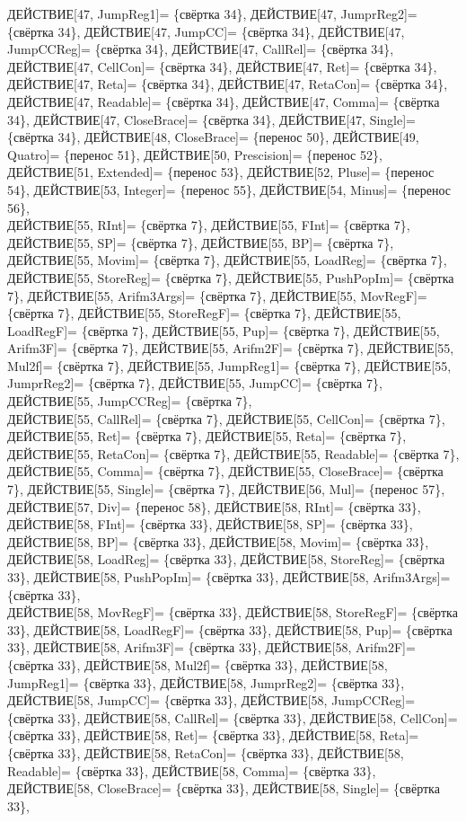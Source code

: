 \documentclass[a0]{a0poster}
\begin{document}
ДЕЙСТВИЕ[47, JumpReg1]= \{свёртка 34\}, ДЕЙСТВИЕ[47, JumprReg2]= \{свёртка 34\}, ДЕЙСТВИЕ[47, JumpCC]= \{свёртка 34\}, ДЕЙСТВИЕ[47, JumpCCReg]= \{свёртка 34\}, ДЕЙСТВИЕ[47, CallRel]= \{свёртка 34\}, ДЕЙСТВИЕ[47, CellCon]= \{свёртка 34\}, ДЕЙСТВИЕ[47, Ret]= \{свёртка 34\}, ДЕЙСТВИЕ[47, Reta]= \{свёртка 34\}, ДЕЙСТВИЕ[47, RetaCon]= \{свёртка 34\}, ДЕЙСТВИЕ[47, Readable]= \{свёртка 34\}, ДЕЙСТВИЕ[47, Comma]= \{свёртка 34\}, ДЕЙСТВИЕ[47, CloseBrace]= \{свёртка 34\}, ДЕЙСТВИЕ[47, Single]= \{свёртка 34\}, ДЕЙСТВИЕ[48, CloseBrace]= \{перенос 50\}, ДЕЙСТВИЕ[49, Quatro]= \{перенос 51\}, ДЕЙСТВИЕ[50, Prescision]= \{перенос 52\}, ДЕЙСТВИЕ[51, Extended]= \{перенос 53\}, ДЕЙСТВИЕ[52, Pluse]= \{перенос 54\}, ДЕЙСТВИЕ[53, Integer]= \{перенос 55\}, ДЕЙСТВИЕ[54, Minus]= \{перенос 56\}, \\
ДЕЙСТВИЕ[55, RInt]= \{свёртка 7\}, ДЕЙСТВИЕ[55, FInt]= \{свёртка 7\}, ДЕЙСТВИЕ[55, SP]= \{свёртка 7\}, ДЕЙСТВИЕ[55, BP]= \{свёртка 7\}, ДЕЙСТВИЕ[55, Movim]= \{свёртка 7\}, ДЕЙСТВИЕ[55, LoadReg]= \{свёртка 7\}, ДЕЙСТВИЕ[55, StoreReg]= \{свёртка 7\}, ДЕЙСТВИЕ[55, PushPopIm]= \{свёртка 7\}, ДЕЙСТВИЕ[55, Arifm3Args]= \{свёртка 7\}, ДЕЙСТВИЕ[55, MovRegF]= \{свёртка 7\}, ДЕЙСТВИЕ[55, StoreRegF]= \{свёртка 7\}, ДЕЙСТВИЕ[55, LoadRegF]= \{свёртка 7\}, ДЕЙСТВИЕ[55, Pup]= \{свёртка 7\}, ДЕЙСТВИЕ[55, Arifm3F]= \{свёртка 7\}, ДЕЙСТВИЕ[55, Arifm2F]= \{свёртка 7\}, ДЕЙСТВИЕ[55, Mul2f]= \{свёртка 7\}, ДЕЙСТВИЕ[55, JumpReg1]= \{свёртка 7\}, ДЕЙСТВИЕ[55, JumprReg2]= \{свёртка 7\}, ДЕЙСТВИЕ[55, JumpCC]= \{свёртка 7\}, ДЕЙСТВИЕ[55, JumpCCReg]= \{свёртка 7\}, \\
ДЕЙСТВИЕ[55, CallRel]= \{свёртка 7\}, ДЕЙСТВИЕ[55, CellCon]= \{свёртка 7\}, ДЕЙСТВИЕ[55, Ret]= \{свёртка 7\}, ДЕЙСТВИЕ[55, Reta]= \{свёртка 7\}, ДЕЙСТВИЕ[55, RetaCon]= \{свёртка 7\}, ДЕЙСТВИЕ[55, Readable]= \{свёртка 7\}, ДЕЙСТВИЕ[55, Comma]= \{свёртка 7\}, ДЕЙСТВИЕ[55, CloseBrace]= \{свёртка 7\}, ДЕЙСТВИЕ[55, Single]= \{свёртка 7\}, ДЕЙСТВИЕ[56, Mul]= \{перенос 57\}, ДЕЙСТВИЕ[57, Div]= \{перенос 58\}, ДЕЙСТВИЕ[58, RInt]= \{свёртка 33\}, ДЕЙСТВИЕ[58, FInt]= \{свёртка 33\}, ДЕЙСТВИЕ[58, SP]= \{свёртка 33\}, ДЕЙСТВИЕ[58, BP]= \{свёртка 33\}, ДЕЙСТВИЕ[58, Movim]= \{свёртка 33\}, ДЕЙСТВИЕ[58, LoadReg]= \{свёртка 33\}, ДЕЙСТВИЕ[58, StoreReg]= \{свёртка 33\}, ДЕЙСТВИЕ[58, PushPopIm]= \{свёртка 33\}, ДЕЙСТВИЕ[58, Arifm3Args]= \{свёртка 33\}, \\
ДЕЙСТВИЕ[58, MovRegF]= \{свёртка 33\}, ДЕЙСТВИЕ[58, StoreRegF]= \{свёртка 33\}, ДЕЙСТВИЕ[58, LoadRegF]= \{свёртка 33\}, ДЕЙСТВИЕ[58, Pup]= \{свёртка 33\}, ДЕЙСТВИЕ[58, Arifm3F]= \{свёртка 33\}, ДЕЙСТВИЕ[58, Arifm2F]= \{свёртка 33\}, ДЕЙСТВИЕ[58, Mul2f]= \{свёртка 33\}, ДЕЙСТВИЕ[58, JumpReg1]= \{свёртка 33\}, ДЕЙСТВИЕ[58, JumprReg2]= \{свёртка 33\}, ДЕЙСТВИЕ[58, JumpCC]= \{свёртка 33\}, ДЕЙСТВИЕ[58, JumpCCReg]= \{свёртка 33\}, ДЕЙСТВИЕ[58, CallRel]= \{свёртка 33\}, ДЕЙСТВИЕ[58, CellCon]= \{свёртка 33\}, ДЕЙСТВИЕ[58, Ret]= \{свёртка 33\}, ДЕЙСТВИЕ[58, Reta]= \{свёртка 33\}, ДЕЙСТВИЕ[58, RetaCon]= \{свёртка 33\}, ДЕЙСТВИЕ[58, Readable]= \{свёртка 33\}, ДЕЙСТВИЕ[58, Comma]= \{свёртка 33\}, ДЕЙСТВИЕ[58, CloseBrace]= \{свёртка 33\}, ДЕЙСТВИЕ[58, Single]= \{свёртка 33\}, 
\\
 
\end{document}
